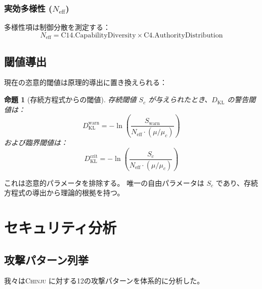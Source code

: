 \documentclass[11pt,a4paper]{article}
\newtheorem{proposition}[theorem]{命題}
\newcommand{\chinju}{\textsc{Chinju}}
\newcommand{\Neff}{N_{\text{eff}}}
\newcommand{\muc}{\mu_c}
\newcommand{\DKL}{D_{\text{KL}}}
\begin{document}
\subsubsection{実効多様性 ($\Neff$)}

多様性項は制御分散を測定する：
\begin{equation}
\Neff = \text{C14.CapabilityDiversity} \times \text{C4.AuthorityDistribution}
\end{equation}

\subsection{閾値導出}

現在の恣意的閾値は原理的導出に置き換えられる：

\begin{proposition}[存続方程式からの閾値]
存続閾値 $S_c$ が与えられたとき、$\DKL$ の警告閾値は：
\begin{equation}
\DKL^{\text{warn}} = -\ln\left(\frac{S_{\text{warn}}}{\Neff \cdot (\mu/\muc)}\right)
\end{equation}
および臨界閾値は：
\begin{equation}
\DKL^{\text{crit}} = -\ln\left(\frac{S_c}{\Neff \cdot (\mu/\muc)}\right)
\end{equation}
\end{proposition}

これは恣意的パラメータを排除する。
唯一の自由パラメータは $S_c$ であり、存続方程式の導出から理論的根拠を持つ。

\section{セキュリティ分析}
\label{sec:security}

\subsection{攻撃パターン列挙}

我々は\chinju{} に対する12の攻撃パターンを体系的に分析した。
\end{document}
